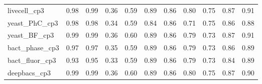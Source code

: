 \documentclass[./dissertation.tex]{subfiles}
\begin{document}
\begin{table}[htbp]
\begin{tabular}{|l|c|c|c|c|c|c|c|c|c|c|}
        livecell\_cp3             & 0.98                                 & 0.99                                  & 0.36                                   & 0.59                                    & 0.89                                   & 0.86                                     & 0.80                                    & 0.75                                    & 0.87                                   & 0.91                                  \\
        yeast\_PhC\_cp3           & 0.98                                 & 0.98                                  & 0.34                                   & 0.59                                    & 0.84                                   & 0.86                                     & 0.71                                    & 0.75                                    & 0.86                                   & 0.88                                  \\
        yeast\_BF\_cp3            & 0.99                                 & 0.99                                  & 0.36                                   & 0.60                                    & 0.89                                   & 0.86                                     & 0.79                                    & 0.73                                    & 0.87                                   & 0.91                                  \\
        bact\_phase\_cp3          & 0.97                                 & 0.97                                  & 0.35                                   & 0.59                                    & 0.89                                   & 0.86                                     & 0.79                                    & 0.73                                    & 0.86                                   & 0.89                                  \\
        bact\_fluor\_cp3          & 0.93                                 & 0.95                                  & 0.33                                   & 0.59                                    & 0.89                                   & 0.86                                     & 0.79                                    & 0.73                                    & 0.84                                   & 0.89                                  \\
        deepbacs\_cp3             & 0.99                                 & 0.99                                  & 0.36                                   & 0.60                                    & 0.89                                   & 0.86                                     & 0.80                                    & 0.75                                    & 0.87                                   & 0.90                                  \\

\end{tabular}
\end{table}
\end{document}
